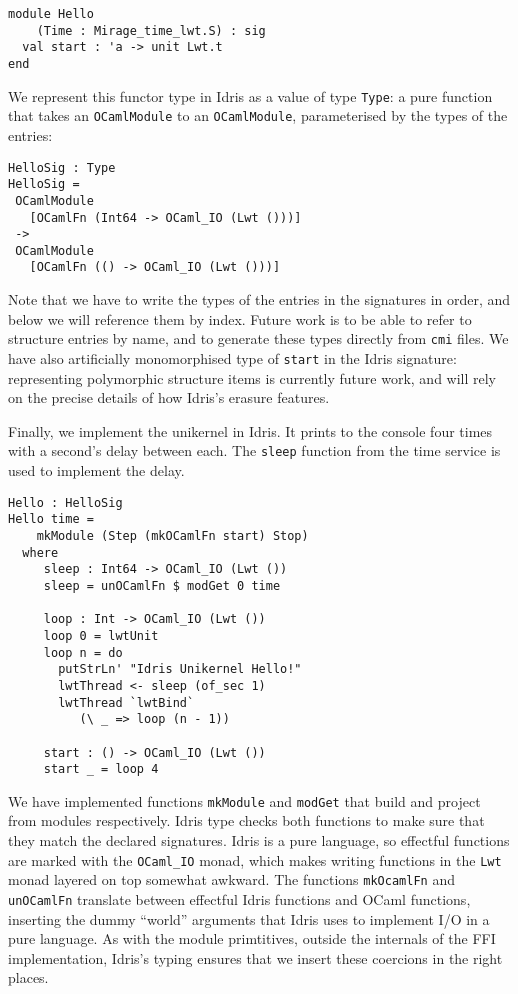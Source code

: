 \documentclass[a4paper,10pt,twocolumn]{article}
\begin{document}
\begin{lstlisting}
module Hello
    (Time : Mirage_time_lwt.S) : sig
  val start : 'a -> unit Lwt.t
end
\end{lstlisting}

We represent this functor type in Idris as a value of type
\texttt{Type}: a pure function that takes an \texttt{OCamlModule} to
an \texttt{OCamlModule}, parameterised by the types of the entries:
\begin{lstlisting}
HelloSig : Type
HelloSig =
 OCamlModule
   [OCamlFn (Int64 -> OCaml_IO (Lwt ()))]
 ->
 OCamlModule
   [OCamlFn (() -> OCaml_IO (Lwt ()))]
\end{lstlisting}
Note that we have to write the types of the entries in the signatures
in order, and below we will reference them by index. Future work is to
be able to refer to structure entries by name, and to generate these
types directly from \texttt{cmi} files. We have also artificially
monomorphised type of \texttt{start} in the Idris signature:
representing polymorphic structure items is currently future work, and
will rely on the precise details of how Idris's erasure features.

Finally, we implement the unikernel in Idris. It prints to the console
four times with a second's delay between each. The \texttt{sleep}
function from the time service is used to implement the delay.
\begin{lstlisting}
Hello : HelloSig
Hello time =
    mkModule (Step (mkOCamlFn start) Stop)
  where
     sleep : Int64 -> OCaml_IO (Lwt ())
     sleep = unOCamlFn $ modGet 0 time

     loop : Int -> OCaml_IO (Lwt ())
     loop 0 = lwtUnit
     loop n = do
       putStrLn' "Idris Unikernel Hello!"
       lwtThread <- sleep (of_sec 1)
       lwtThread `lwtBind`
          (\ _ => loop (n - 1))

     start : () -> OCaml_IO (Lwt ())
     start _ = loop 4
\end{lstlisting}%
We have implemented functions \texttt{mkModule} and \texttt{modGet}
that build and project from modules respectively. Idris type checks
both functions to make sure that they match the declared
signatures. Idris is a pure language, so effectful functions are
marked with the \texttt{OCaml\_IO} monad, which makes writing
functions in the \texttt{Lwt} monad layered on top somewhat
awkward. The functions \texttt{mkOcamlFn} and \texttt{unOCamlFn}
translate between effectful Idris functions and OCaml functions,
inserting the dummy ``world'' arguments that Idris uses to implement
I/O in a pure language. As with the module primtitives, outside the
internals of the FFI implementation, Idris's typing ensures that we
insert these coercions in the right places.
\end{document}
